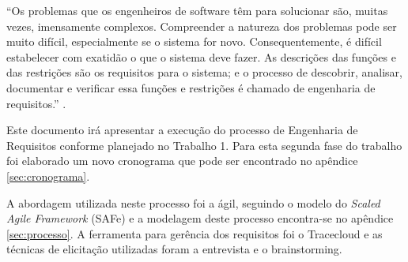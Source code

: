 “Os problemas que os engenheiros de software têm para solucionar são, muitas vezes, imensamente complexos. Compreender a natureza dos problemas pode ser muito difícil, especialmente se o sistema for novo. Consequentemente, é difícil estabelecer com exatidão o que o sistema deve fazer. As descrições das funções e das restrições são os requisitos para o sistema; e o processo de descobrir, analisar, documentar e verificar essa funções e restrições é chamado de engenharia de requisitos.” \cite{ian}.

Este documento irá apresentar a execução do processo de Engenharia de Requisitos conforme planejado no Trabalho 1. Para esta segunda fase  do trabalho foi elaborado um novo cronograma que pode ser encontrado no apêndice \ref{sec:cronograma}.

A abordagem utilizada neste processo foi a ágil,  seguindo o modelo do \textit{Scaled Agile Framework} (SAFe) e a modelagem deste processo encontra-se no apêndice \ref{sec:processo}. A ferramenta para gerência dos requisitos foi o Tracecloud e as técnicas de elicitação utilizadas foram a entrevista e  o brainstorming.
